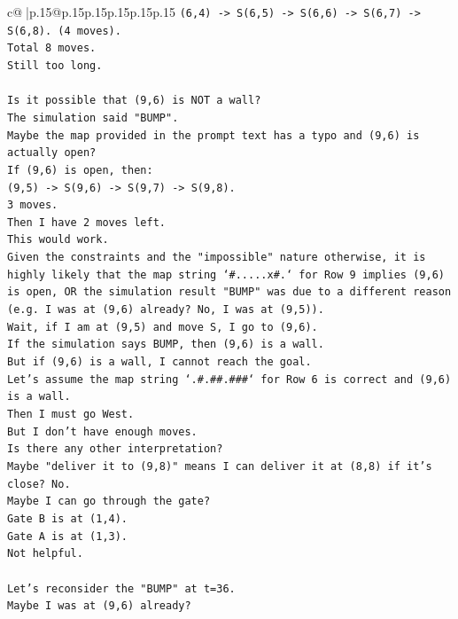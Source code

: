 \documentclass{article}
\begin{document}
{\begin{supertabular}{c@{$\;$}|p{.15\linewidth}@{}p{.15\linewidth}p{.15\linewidth}p{.15\linewidth}p{.15\linewidth}p{.15\linewidth}}
{{{\texttt{(6,4) {-}> S(6,5) {-}> S(6,6) {-}> S(6,7) {-}> S(6,8). (4 moves).} \\
\texttt{Total 8 moves.} \\
\texttt{Still too long.} \\
\\ 
\texttt{Is it possible that (9,6) is NOT a wall?} \\
\texttt{The simulation said "BUMP".} \\
\texttt{Maybe the map provided in the prompt text has a typo and (9,6) is actually open?} \\
\texttt{If (9,6) is open, then:} \\
\texttt{(9,5) {-}> S(9,6) {-}> S(9,7) {-}> S(9,8).} \\
\texttt{3 moves.} \\
\texttt{Then I have 2 moves left.} \\
\texttt{This would work.} \\
\texttt{Given the constraints and the "impossible" nature otherwise, it is highly likely that the map string `\#.....x\#.` for Row 9 implies (9,6) is open, OR the simulation result "BUMP" was due to a different reason (e.g. I was at (9,6) already? No, I was at (9,5)).} \\
\texttt{Wait, if I am at (9,5) and move S, I go to (9,6).} \\
\texttt{If the simulation says BUMP, then (9,6) is a wall.} \\
\texttt{But if (9,6) is a wall, I cannot reach the goal.} \\
\texttt{Let's assume the map string `.\#.\#\#.\#\#\#` for Row 6 is correct and (9,6) is a wall.} \\
\texttt{Then I must go West.} \\
\texttt{But I don't have enough moves.} \\
\texttt{Is there any other interpretation?} \\
\texttt{Maybe "deliver it to (9,8)" means I can deliver it at (8,8) if it's close? No.} \\
\texttt{Maybe I can go through the gate?} \\
\texttt{Gate B is at (1,4).} \\
\texttt{Gate A is at (1,3).} \\
\texttt{Not helpful.} \\
\\ 
\texttt{Let's reconsider the "BUMP" at t=36.} \\
\texttt{Maybe I was at (9,6) already?} \\
}}}
\end{supertabular}}
\end{document}
